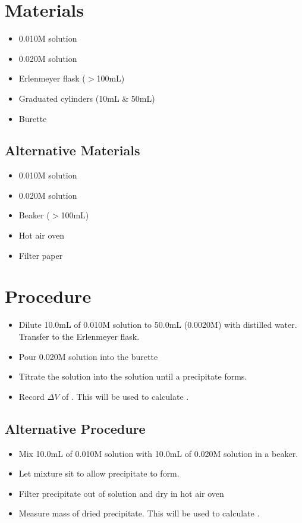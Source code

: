 \section{Materials}
\begin{itemize}
    \item 0.010M  solution
    \item 0.020M  solution
    \item Erlenmeyer flask ($>$100mL)
    \item Graduated cylinders (10mL \& 50mL)
    \item Burette
\end{itemize}

\subsection{Alternative Materials}
\begin{itemize}
    \item 0.010M  solution
    \item 0.020M  solution
    \item Beaker ($>$100mL)
    \item Hot air oven
    \item Filter paper
\end{itemize}

\section{Procedure}
\begin{itemize}
    \item Dilute 10.0mL of 0.010M  solution to 50.0mL (0.0020M) with distilled water. Transfer to the Erlenmeyer flask.
    \item Pour 0.020M  solution into the burette
    \item Titrate the  solution into the  solution until a precipitate forms.
    \item Record $\Delta V$ of . This will be used to calculate \ksp.
\end{itemize}

\subsection{Alternative Procedure}
\begin{itemize}
    \item Mix 10.0mL of 0.010M  solution with 10.0mL of 0.020M  solution in a beaker.
    \item Let mixture sit to allow precipitate to form.
    \item Filter precipitate out of solution and dry in hot air oven
    \item Measure mass of dried precipitate. This will be used to calculate \ksp.
\end{itemize}